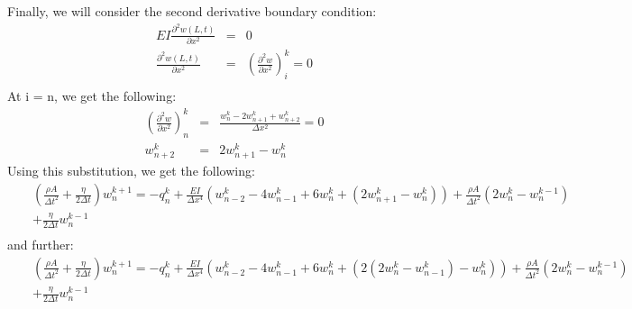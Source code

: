 \documentclass[a4paper]{article}
\begin{document}
Finally, we will consider the second derivative boundary condition:
\begin{eqnarray*}
EI\frac{\partial ^{2}w(L,t)}{\partial x^{2}} & = & 0\\
\frac{\partial ^{2}w(L,t)}{\partial x^{2}} & = & (\frac{\partial^{2} w}{\partial x^{2}})^{k}_{i}= 0\\
\end{eqnarray*}
At i = n, we get the following:
\begin{eqnarray*}
(\frac{\partial^{2} w}{\partial x^{2}})^{k}_{n } & = & \frac{w^{k}_{n}-2 w^{k}_{n+1}+w^{k}_{n+2}}{\Delta x^{2}} = 0\\
w^{k}_{n+2} & = & 2 w^{k}_{n+1}-w^{k}_{n}
\end{eqnarray*}
Using this substitution, we get the following:
\begin{eqnarray*}
& & (\frac{\rho A}{\Delta t^{2}}+\frac{\eta}{2\Delta t})w^{k+1}_{n} = -q^{k}_{n} + \frac{EI}{\Delta x^{4}}(w^{k}_{n-2}-4w^{k}_{n-1}+6w^{k}_{n}+(2 w^{k}_{n+1}-w^{k}_{n})) + \frac{\rho A}{\Delta t^{2}}(2w^{k}_{n}-w^{k-1}_{n})\\
& & + \frac{\eta}{2\Delta t}w^{k-1}_{n}\\
\end{eqnarray*}
and further:
\begin{eqnarray*}
& & (\frac{\rho A}{\Delta t^{2}}+\frac{\eta}{2\Delta t})w^{k+1}_{n} = -q^{k}_{n} + \frac{EI}{\Delta x^{4}}(w^{k}_{n-2}-4w^{k}_{n-1}+6w^{k}_{n}+(2 (2 w^{k}_{n}-w^{k}_{n-1})-w^{k}_{n})) + \frac{\rho A}{\Delta t^{2}}(2w^{k}_{n}-w^{k-1}_{n})\\
& & + \frac{\eta}{2\Delta t}w^{k-1}_{n}\\
\end{eqnarray*}
\end{document}
